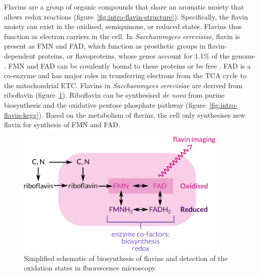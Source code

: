 Flavins are a group of organic compounds that share an aromatic moiety that allows redox reactions (figure~\ref{fig:intro-flavin-structure}).
Specifically, the flavin moiety can exist in the oxidised, semiquinone, or reduced states.
Flavins thus function as electron carriers in the cell.
In \emph{Saccharomyces cerevisiae}, flavin is present as FMN and FAD, which function as prosthetic groups in flavin-dependent proteins, or flavoproteins, whose genes account for 1.1\% of the genome \parencite{gudipatiFlavoproteomeYeastSaccharomyces2014}.
FMN and FAD can be covalently bound to these proteins or be free \parencite{mewiesCovalentAttachmentFlavin1998}.
FAD is a co-enzyme and has major roles in transferring electrons from the TCA cycle to the mitochondrial ETC.
Flavins in \emph{Saccharomyces cerevisiae} are derived from riboflavin (figure~\ref{fig:intro-flavin-schematic}).
Riboflavin can be synthesised \emph{de novo} from purine biosynthesis and the oxidative pentose phosphate pathway (figure~\ref{fig:intro-flavin-kegg}).
Based on the metabolism of flavins, the cell only synthesises new flavin for synthesis of FMN and FAD.


\begin{figure}
  \centering
  \includegraphics[width=0.9\textwidth]{flavin-cell-schematic}
  \caption{
    Simplified schematic of biosynthesis of flavins and detection of the oxidation states in fluorescence microscopy.
    }
  \label{fig:intro-flavin-schematic}
\end{figure}

